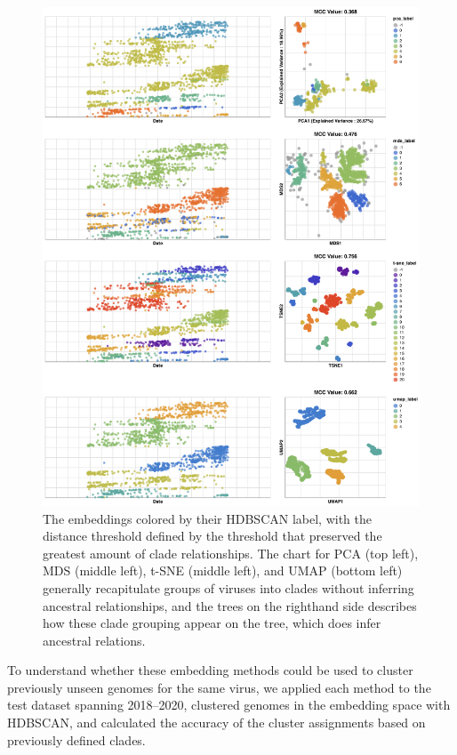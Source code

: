 \documentclass[9pt,lineno]{elife}
\begin{document}
\begin{figure}[htb]
  \begin{center}
  \includegraphics[width=\columnwidth]{fullHDBSCANChartFlu.png}
  \caption{
    The embeddings colored by their HDBSCAN label, with the distance threshold defined by the threshold that preserved the greatest amount of clade relationships.
    The chart for PCA (top left), MDS (middle left), t-SNE (middle left), and UMAP (bottom left) generally recapitulate groups of viruses into clades without inferring ancestral relationships, and the trees on the righthand side describes how these clade grouping appear on the tree, which does infer ancestral relations.
  }
  \label{fig:seasonal-influenza-h3n2-ha-clusters}
  \end{center}
\end{figure}

To understand whether these embedding methods could be used to cluster previously unseen genomes for the same virus, we applied each method to the test dataset spanning 2018--2020, clustered genomes in the embedding space with HDBSCAN, and calculated the accuracy of the cluster assignments based on previously defined clades.
\end{document}
